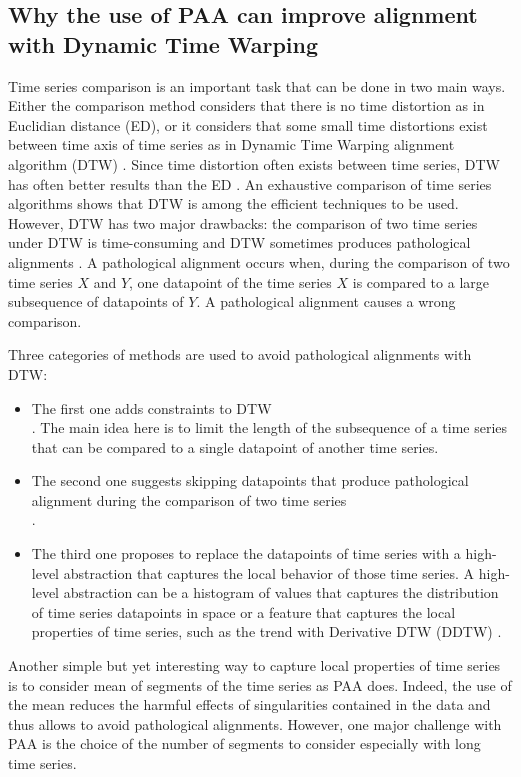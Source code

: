 \subsection{Why the use of PAA can improve alignment with Dynamic Time Warping}

 Time series comparison is an important task that
can be done in two main ways.
Either the comparison method  considers that there is no time distortion as in Euclidian distance
(ED), or it considers that  some small time distortions  exist between time axis of time series as
in Dynamic Time Warping alignment algorithm (DTW)
\cite{Zhang_Tang_Duan_2015}. Since time distortion often exists between time series, DTW  has often
better results than the ED \cite{UCRArchive}. An exhaustive comparison of time series algorithms
\cite{Bagnall} shows that DTW is among the efficient techniques to be used. However, DTW has two major
drawbacks:
 the comparison of two time series under DTW is time-consuming
\cite{Rakthanmanon_Campana_Mueen_Batista_Westover_Zhu_Zakaria_Keogh_2012} and  DTW
sometimes produces pathological alignments \cite{Keogh_Pazzani_2001}. A
pathological alignment occurs when, during the comparison of two time  series $X$
and $Y$, one datapoint of the time series $X$ is compared to a large subsequence
of datapoints of $Y$.  A pathological alignment causes a wrong comparison.


 Three categories of methods are used to avoid pathological alignments with DTW:

\begin{itemize}
  \item The first one adds constraints to DTW \cite{Ratanamahatana_Keogh_2004} \cite{Yu_Yu_Hu_Liu_Wu_2011}  \cite{candan2012sdtw}  \cite{sakoe1978dynamic} \\ \cite{jeong2011weighted}  \cite{salvador2007toward}.
  The main idea here is to limit the length of the subsequence of a time series
  that can be compared to a single datapoint of another time series.
  
  \item The second one suggests skipping datapoints that
  produce pathological alignment during the comparison of two time series \cite{longin2005elastic} \\ \cite{itakura1975minimum}  \cite{myers1980performance}.
  \item The third one proposes to replace the datapoints of time
  series with a high-level abstraction that captures the local behavior of those
  time series. A high-level abstraction can be a histogram of values that
  captures the distribution of time series datapoints in space \cite{Zhang_Tang_Duan_2015} or a 
  feature that captures the local  properties of time series, such as the trend with Derivative DTW
  (DDTW) \cite{Keogh_Pazzani_2001}.
\end{itemize}
Another simple but yet interesting way to capture local properties of time series is to consider
mean of segments of the time series as PAA does. Indeed, the use of the mean reduces the harmful
effects of singularities contained in the data and thus allows to avoid pathological
alignments.  However, one major challenge with PAA is the choice of the number of segments to
consider especially with long time series.


